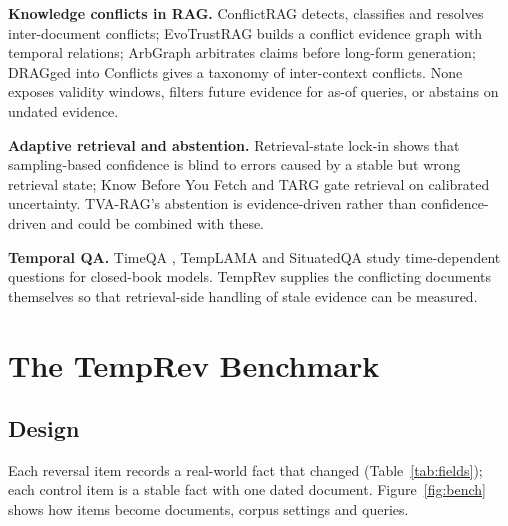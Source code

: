 \documentclass[11pt,a4paper]{report}
\begin{document}
\textbf{Knowledge conflicts in RAG.} ConflictRAG \cite{conflictrag} detects, classifies and resolves inter-document conflicts; EvoTrustRAG \cite{evotrust} builds a conflict evidence graph with temporal relations; ArbGraph \cite{arbgraph} arbitrates claims before long-form generation; DRAGged into Conflicts \cite{dragged} gives a taxonomy of inter-context conflicts. None exposes validity windows, filters future evidence for as-of queries, or abstains on undated evidence.

\textbf{Adaptive retrieval and abstention.} Retrieval-state lock-in \cite{lockin} shows that sampling-based confidence is blind to errors caused by a stable but wrong retrieval state; Know Before You Fetch \cite{kbyf} and TARG \cite{targ} gate retrieval on calibrated uncertainty. TVA-RAG's abstention is evidence-driven rather than confidence-driven and could be combined with these.

\textbf{Temporal QA.} TimeQA \cite{timeqa}, TempLAMA \cite{templama} and SituatedQA \cite{situatedqa} study time-dependent questions for closed-book models. TempRev supplies the conflicting documents themselves so that retrieval-side handling of stale evidence can be measured.

\chapter{The TempRev Benchmark}
\section{Design}
Each reversal item records a real-world fact that changed (Table~\ref{tab:fields}); each control item is a stable fact with one dated document. Figure~\ref{fig:bench} shows how items become documents, corpus settings and queries.
\end{document}
